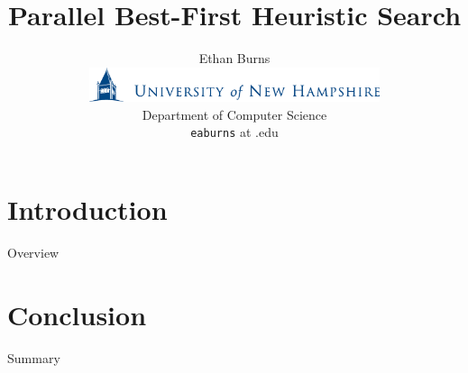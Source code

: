 \documentclass[style=unh]{powerdot}
\title{Parallel Best-First Heuristic Search}
\author{Ethan Burns \vspace{0.2in} \\
        \includegraphics[height=0.4in]{figures/unh-logo-words.eps} \\
        Department of Computer Science \\
	{\tt eaburns} at {\ttunh.edu}}
\date{\mbox{}}
\begin{document}
\maketitle


\section[slide=false]{Introduction}


\begin{slide}{Overview}
\end{slide}


\section[slide=false]{Conclusion}


\begin{slide}{Summary}
\end{slide}

\end{document}

